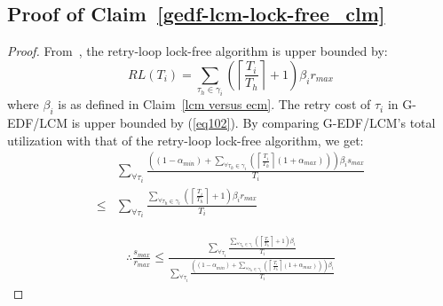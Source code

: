 \documentclass[letter]{sig-alternate}
\begin{document}
\subsection{\label{proof_gedf-lcm-lock-free_clm}Proof of Claim~\ref{gedf-lcm-lock-free_clm}}
\begin{proof}
From~\cite{key-5}, the retry-loop lock-free algorithm
is upper bounded by: 
\begin{equation}
RL(T_{i})=\sum_{\tau_{h}\in\gamma_{i}}\left(\left\lceil \frac{T_{i}}{T_{h}}\right\rceil +1\right)\beta_{i}r_{max}\label{eq32_1}
\end{equation}
 where $\beta_{i}$ is as defined in Claim~\ref{lcm versus ecm}.
The retry cost of $\tau_{i}$ in G-EDF/LCM is upper bounded by (\ref{eq102}).
By comparing G-EDF/LCM's total utilization with that of the retry-loop
lock-free algorithm, we get: 
\begin{eqnarray*}
 & \sum_{\forall\tau_{i}}\frac{\left((1-\alpha_{min})+\sum_{\forall\tau_{h}\in\gamma_{i}}\left(\left\lceil \frac{T_{i}}{T_{h}}\right\rceil (1+\alpha_{max})\right)\right)\beta_{i}s_{max}}{T_{i}}\\
\le & \sum_{\forall\tau_{i}}\frac{\sum_{\forall\tau_{h}\in\gamma_{i}}\left(\left\lceil \frac{T_{i}}{T_{h}}\right\rceil +1\right)\beta_{i}r_{max}}{T_{i}}
\end{eqnarray*}
 
\begin{eqnarray}
\therefore\frac{s_{max}}{r_{max}}\le\frac{\sum_{\forall\tau_{i}}\frac{\sum_{\forall\tau_{h}\in\gamma_{i}}\left(\left\lceil \frac{T_{i}}{T_{h}}\right\rceil +1\right)\beta_{i}}{T_{i}}}{\sum_{\forall\tau_{i}}\frac{\left((1-\alpha_{min})+\sum_{\forall\tau_{h}\in\gamma_{i}}\left(\left\lceil \frac{T_{i}}{T_{h}}\right\rceil (1+\alpha_{max})\right)\right)\beta_{i}}{T_{i}}}\label{u-gedf-lcm-ecm}
\end{eqnarray}



\end{proof}
\end{document}
